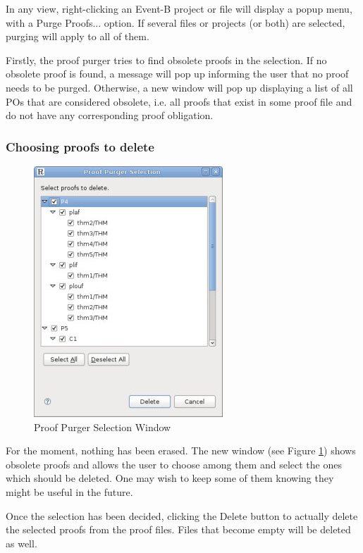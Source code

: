 In any view, right-clicking an Event-B project or file will display a popup menu, with a \textsf{Purge Proofs...} option. If several files or projects (or both) are selected, purging will apply to all of them.

Firstly, the proof purger tries to find obsolete proofs in the selection. If no obsolete proof is found, a message will pop up informing the user that no proof needs to be purged. Otherwise, a new window will pop up displaying a list of all POs that are considered obsolete, i.e. all proofs that exist in some proof file and do not have any corresponding proof obligation. 

\subsubsection{Choosing proofs to delete}

\begin{figure}[h!t]
\begin{center}
	\includegraphics{img/reference/ref_10_proof_purger.png}
	\caption{Proof Purger Selection Window}
	\label{fig_ref_10_proof_purger}
\end{center}
\end{figure}

For the moment, nothing has been erased. The new window (see Figure \ref{fig_ref_10_proof_purger}) shows obsolete proofs and allows the user to choose among them and select the ones which should be deleted. One may wish to keep some of them knowing they might be useful in the future.

Once the selection has been decided, clicking the Delete button to actually delete the selected proofs from the proof files. Files that become empty will be deleted as well.

